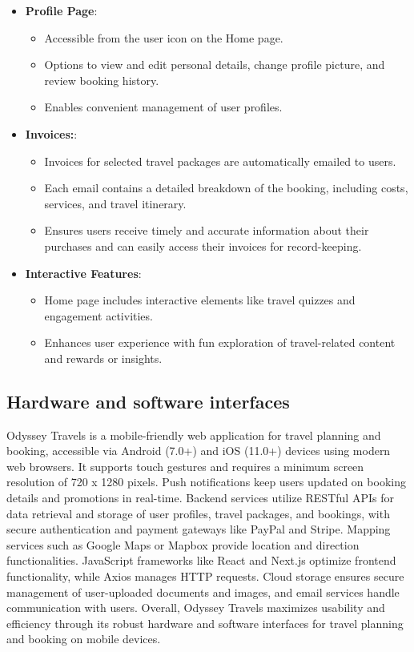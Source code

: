 \documentclass{scrreprt}
\begin{document}
\begin{itemize}
    \item \textbf{Profile Page}:
    \begin{itemize}
        \item Accessible from the user icon on the Home page.
        \item Options to view and edit personal details, change profile picture, and review booking history.
        \item Enables convenient management of user profiles.
    \end{itemize}
    
    \item \textbf{Invoices:}:
    \begin{itemize}
        \item Invoices for selected travel packages are automatically emailed to users.
        \item  Each email contains a detailed breakdown of the booking, including costs, services, and travel itinerary.
        \item Ensures users receive timely and accurate information about their purchases and can easily access their invoices for record-keeping.
    \end{itemize}
    \item \textbf{Interactive Features}:
    \begin{itemize}
        \item Home page includes interactive elements like travel quizzes and engagement activities.
        \item Enhances user experience with fun exploration of travel-related content and rewards or insights.
    \end{itemize}
    
\end{itemize}

\subsection{Hardware and software interfaces}
Odyssey Travels is a mobile-friendly web application for travel planning and booking, accessible via Android (7.0+) and iOS (11.0+) devices using modern web browsers. It supports touch gestures and requires a minimum screen resolution of 720 x 1280 pixels. Push notifications keep users updated on booking details and promotions in real-time.
Backend services utilize RESTful APIs for data retrieval and storage of user profiles, travel packages, and bookings, with secure authentication and payment gateways like PayPal and Stripe. Mapping services such as Google Maps or Mapbox provide location and direction functionalities.
JavaScript frameworks like React and Next.js optimize frontend functionality, while Axios manages HTTP requests. Cloud storage ensures secure management of user-uploaded documents and images, and email services handle communication with users. Overall, Odyssey Travels maximizes usability and efficiency through its robust hardware and software interfaces for travel planning and booking on mobile devices.
\end{document}
